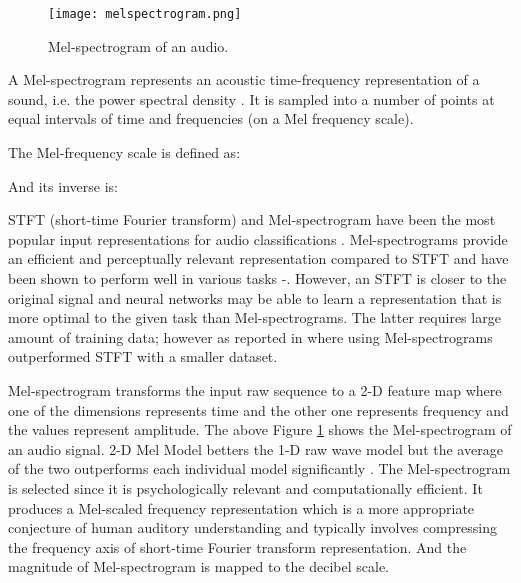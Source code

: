 \documentclass[a4paper]{article}
\begin{document}
\begin{figure}[t] 
  \centering
  \texttt{[image: melspectrogram.png]}
  \caption{Mel-spectrogram of an audio.}
  \label{fig:melspectrogram}
\end{figure}

    A Mel-spectrogram represents an acoustic time-frequency representation of a sound, i.e. the power spectral density . It is sampled into a number of points at equal intervals of time  and frequencies  (on a Mel frequency scale).
    
    The Mel-frequency scale is defined as:
        
    And its inverse is:
    	
STFT (short-time Fourier transform) and Mel-spectrogram have been the most popular input representations for audio classifications \cite{melref}. Mel-spectrograms provide an efficient and perceptually relevant representation compared to STFT \cite{hearref} and have been shown to perform well in various tasks \cite{melperf1}-\cite{melperf5}. However, an STFT is closer to the original signal and neural networks may be able to learn a representation that is more optimal to the given task than Mel-spectrograms. The latter requires large amount of training data; however as reported in \cite{melexp}  where using Mel-spectrograms outperformed STFT with a smaller dataset.


   Mel-spectrogram transforms the input raw sequence to a 2-D feature map where one of the dimensions represents time and the other one represents frequency and the values represent amplitude. The above Figure \ref{fig:melspectrogram} shows the Mel-spectrogram of an audio signal. 2-D Mel Model betters the 1-D raw wave model but the average of the two outperforms each individual model significantly \cite{1d2d}. The Mel-spectrogram is selected since it is psychologically relevant and computationally efficient. It produces a Mel-scaled frequency representation which is a more appropriate conjecture of human auditory understanding \cite{hearref} and typically involves compressing the frequency axis of short-time Fourier transform representation. And the magnitude of Mel-spectrogram is mapped to the decibel scale.
\end{document}
